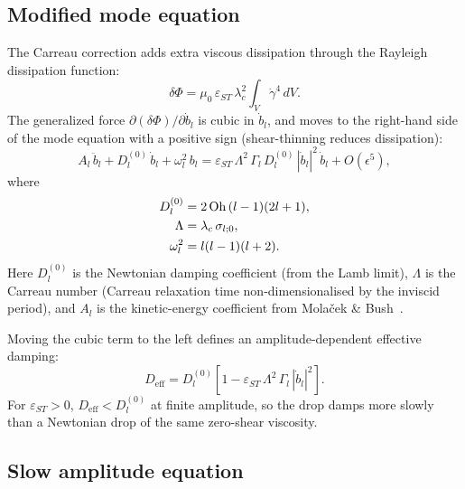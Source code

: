 \subsection{Modified mode equation}

The Carreau correction adds extra viscous dissipation through the Rayleigh
dissipation function:
\[
  \delta\Phi = \mu_0\,\varepsilon_{ST}\,\lambda_c^2
  \int_V \dot\gamma^4\,dV.
\]
The generalized force $\partial(\delta\Phi)/\partial\dot{b}_l$ is cubic in
$\dot{b}_l$, and moves to the right-hand side of the mode equation with a
positive sign (shear-thinning reduces dissipation):
\begin{equation}
  A_l\,\ddot{b}_l
  + D_l^{(0)}\,\dot{b}_l
  + \omega_l^2\,b_l
  = \varepsilon_{ST}\,\Lambda^2\,\Gamma_l\,D_l^{(0)}\,|\dot{b}_l|^2\,\dot{b}_l
  + O(\epsilon^5),
  \label{eq:mode_carreau}
\end{equation}
where
\begin{align}
  D_l^{(0)} &= 2\,\mathrm{Oh}\,(l-1)(2l+1), \label{eq:Dl0}\\
  \Lambda    &= \lambda_c\,\sigma_{l;0}, \label{eq:Lambda}\\
  \omega_l^2 &= l(l-1)(l+2). \notag
\end{align}
Here $D_l^{(0)}$ is the Newtonian damping coefficient (from the Lamb limit),
$\Lambda$ is the Carreau number (Carreau relaxation time non-dimensionalised
by the inviscid period), and $A_l$ is the kinetic-energy coefficient from
Mola\v{c}ek \& Bush~\cite{molacek2012}.

Moving the cubic term to the left defines an amplitude-dependent effective
damping:
\begin{equation}
  D_{\mathrm{eff}} = D_l^{(0)}
  \left[1 - \varepsilon_{ST}\,\Lambda^2\,\Gamma_l\,|\dot{b}_l|^2\right].
  \label{eq:Deff}
\end{equation}
For $\varepsilon_{ST} > 0$, $D_{\mathrm{eff}} < D_l^{(0)}$ at finite
amplitude, so the drop damps more slowly than a Newtonian drop of the same
zero-shear viscosity.

\subsection{Slow amplitude equation}
\label{sec:carreau_slow}

